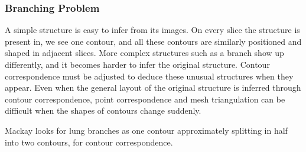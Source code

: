 \documentclass[11p, titlepage]{article}
\begin{document}
\subsubsection{Branching Problem}

A simple structure is easy to infer from its images. On every slice the structure is present in, we see one contour, and all these contours are similarly positioned and shaped in adjacent slices. More complex structures such as a branch show up differently, and it becomes harder to infer the original structure. Contour correspondence must be adjusted to deduce these unusual structures when they appear. Even when the general layout of the original structure is inferred through contour correspondence, point correspondence and mesh triangulation can be difficult when the shapes of contours change suddenly.

Mackay \cite{mackay2019robust} looks for lung branches as one contour approximately splitting in half into two contours, for contour correspondence.
\end{document}
